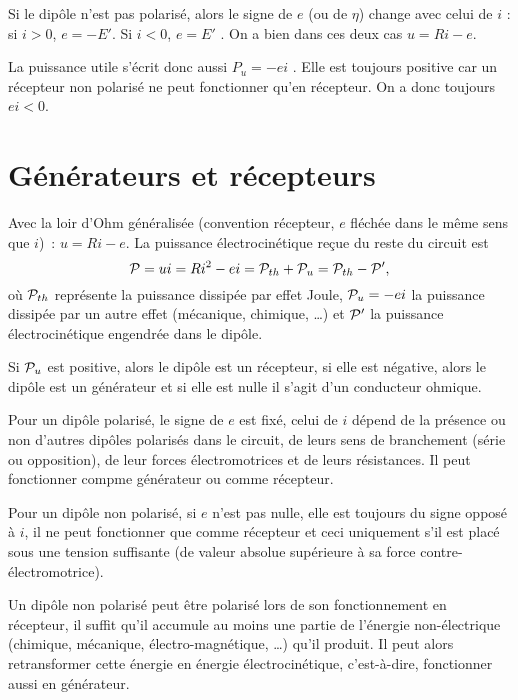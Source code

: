 Si le dipôle n'est pas polarisé, alors le signe de $e$ (ou de $\eta$) change avec celui de $i$ : si $i > 0$, $e = -E'$. Si $i < 0$, $e = E'$ . On a bien dans ces deux cas $u = R i - e$.

La puissance utile s'écrit donc aussi $P_u = - e i$ . Elle est toujours positive car un récepteur non polarisé ne peut fonctionner qu'en récepteur. On a donc toujours $ei < 0$.

\section{Générateurs et récepteurs}
Avec la loir d'Ohm généralisée (convention récepteur, $e$ fléchée dans le même sens que $i$)~: $u=Ri-e$. La puissance électrocinétique reçue du reste du circuit est
\begin{equation}
	\P = ui = Ri^2 - ei = \P_{th}+ \P_u = \P_{th} - \P',
\end{equation}
où $\P_{th}$ représente la puissance dissipée par effet Joule, $\P_u=-ei$ la puissance dissipée par un autre effet (mécanique, chimique, \ldots{}) et $\P'$ la puissance électrocinétique engendrée dans le dipôle.

Si $\P_u$ est positive, alors le dipôle est un récepteur, si elle est négative, alors le dipôle est un générateur et si elle est nulle il s'agit d'un conducteur ohmique.

Pour un dipôle polarisé, le signe de $e$ est fixé, celui de $i$ dépend de la présence ou non d'autres dipôles polarisés dans le circuit, de leurs sens de branchement (série ou opposition), de leur forces électromotrices et de leurs résistances. Il peut fonctionner compme générateur ou comme récepteur.

Pour un dipôle non polarisé, si $e$ n'est pas nulle, elle est toujours du signe opposé à $i$, il ne peut fonctionner que comme récepteur et ceci uniquement s'il est placé sous une tension suffisante (de valeur absolue supérieure à sa force contre-électromotrice).

Un dipôle non polarisé peut être polarisé lors de son fonctionnement en récepteur, il suffit qu'il accumule au moins une partie de l'énergie non-électrique (chimique, mécanique, électro-magnétique, \ldots) qu'il produit. Il peut alors retransformer cette énergie en énergie électrocinétique, c'est-à-dire, fonctionner aussi en générateur.

